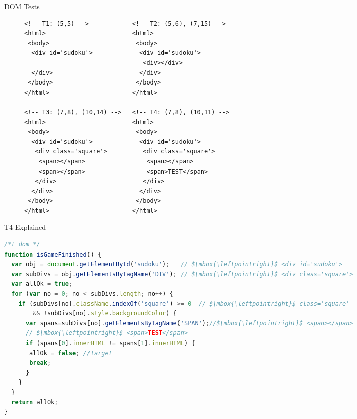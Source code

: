 \documentclass{beamer}
\begin{document}
\begin{frame}[fragile]{DOM Tests}

\begin{figure}
  \begin{lstlisting}[style=htmlcssjs,language=HTML5,basicstyle={\tiny\ttfamily}]
<!-- T1: (5,5) -->            <!-- T2: (5,6), (7,15) -->
<html>                        <html>
 <body>                        <body>
  <div id='sudoku'>             <div id='sudoku'>
                                 <div></div>
  </div>                        </div>
 </body>                       </body>
</html>                       </html>

<!-- T3: (7,8), (10,14) -->   <!-- T4: (7,8), (10,11) -->
<html>                        <html>
 <body>                        <body>
  <div id='sudoku'>             <div id='sudoku'>
   <div class='square'>          <div class='square'>
    <span></span>                 <span></span>
    <span></span>                 <span>TEST</span>
   </div>                        </div>
  </div>                        </div>
 </body>                       </body>
</html>                       </html>
  \end{lstlisting}
\end{figure}  

\pause


\end{frame}

\begin{frame}[fragile]{T4 Explained}
\begin{adjustbox}{width=10cm}     \begin{lstlisting}[style=htmlcssjs,language=JavaScript,basicstyle={\tiny\ttfamily},mathescape=true]
/*t dom */
function isGameFinished() {
  var obj = document.getElementById('sudoku');   // $\mbox{\leftpointright}$ <div id='sudoku'>
  var subDivs = obj.getElementsByTagName('DIV'); // $\mbox{\leftpointright}$ <div class='square'>
  var allOk = true;
  for (var no = 0; no < subDivs.length; no++) { 
    if (subDivs[no].className.indexOf('square') >= 0  // $\mbox{\leftpointright}$ class='square'
        && !subDivs[no].style.backgroundColor) {
      var spans=subDivs[no].getElementsByTagName('SPAN');//$\mbox{\leftpointright}$ <span></span>
      // $\mbox{\leftpointright}$ <span>TEST</span>
      if (spans[0].innerHTML != spans[1].innerHTML) { 
       allOk = false; //target 
       break;
      }
    }
  } 
  return allOk;
}
  \end{lstlisting}
  \end{adjustbox}
\end{frame}
\end{document}
